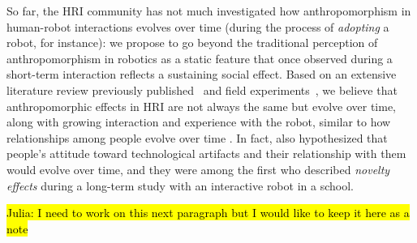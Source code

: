 \documentclass{frontiersSCNS} %
\begin{document}
So far, the HRI community has not much investigated how anthropomorphism in
human-robot interactions evolves over time (during the process of
\emph{adopting} a robot, for instance): we propose to go beyond the traditional
perception of anthropomorphism in robotics as a static feature that once
observed during a short-term interaction reflects a sustaining social effect.
Based on an extensive literature review previously
published~\citep{fink_anthropomorphism_2012} and field
experiments~, we believe that anthropomorphic effects in HRI are
not always the same but evolve over time, along with growing interaction and
experience with the robot, similar to how relationships among people evolve
over time . In fact, \citet{kanda_interactive_2004}
also hypothesized that people's attitude toward technological artifacts and
their relationship with them would evolve over time, and they were among the
first who described \emph{novelty effects} during a long-term study with an
interactive robot in a school.


\hl{Julia: I need to work on this next paragraph but I would like to keep it here as a note}
\end{document}
